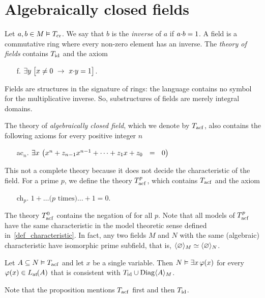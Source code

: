 \documentclass[creche.tex]{subfiles}
\begin{document}
\section{Algebraically closed fields}

Let $a,b\in M\models T_{\rm cr}$. We say that $b$ is the \emph{inverse\/} of $a$ if $a\mdot b=1$. A field is a commutative ring where every non-zero element has an inverse. The \emph{theory of fields\/} contains $T_{\rm id}$ and the axiom
\begin{itemize}
\item[f.]$\E  y\; \big[x\neq0\ \imp\ x\mdot y =1\big]$.
\end{itemize}
Fields are structures in the signature of rings: the language contains no symbol for the multiplicative inverse. So, substructures of fields are merely integral domains.

The theory of \emph{algebraically closed field}, which we denote by \emph{$T_{\rm acf}$}, also contains the following axioms for every positive integer $n$

\begin{itemize}
\item[ac$_n$.] $\E x\ \big(x^{n} + z_{n-1}x^{n-1} + \dots + z_1 x + z_0\ \ =\ \ 0\big)$
\end{itemize}

This not a complete theory because it does not decide the characteristic of the field. For a prime $p$, we define the theory \emph{$T^p_{\rm acf}$}, which contains $T_{\rm acf}$ and the axiom
\begin{itemize}
\item[ch$_p$.]$1+\dots \mbox{($p$ times)}\dots +1=0$.
\end{itemize}
The theory \emph{$T^0_{\rm acf}$\/} contains the negation of  for all $p$. Note that all models of $T^p_{\rm acf}$ have the same characteristic in the model theoretic sense defined in~\ref{def_characteristic}. In fact, any two fields $M$ and $N$ with the same (algebraic) characteristic have isomorphic prime subfield, that is, $\<\0\>_M \simeq \<\0\>_N$.

\begin{proposition}\label{prop_acf_cons_sodd}
Let $A\subseteq N\models T_{\rm acf}$ and let $x$ be a single variable. Then $N\models\E x \,\phi(x)$ for every  $\phi(x)\in\atL(A)$ that is consistent with $T_{\rm id}\cup\Diag\<A\>_M$.
\end{proposition}

Note that the proposition mentions $T_{\rm acf}$ first and then $T_{\rm id}$. 
\end{document}
